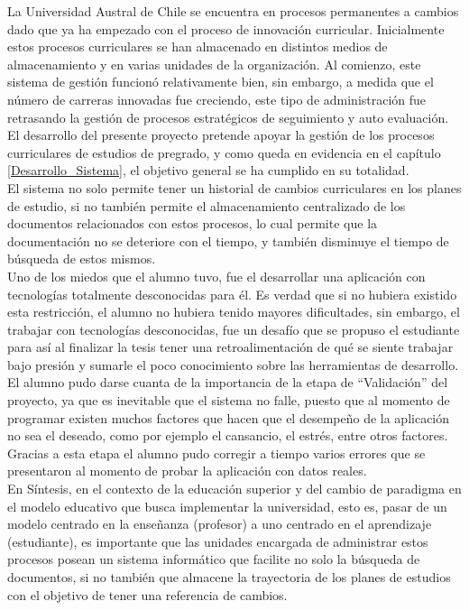La Universidad Austral de Chile se encuentra en procesos permanentes a cambios dado que ya ha empezado con
el proceso de innovación curricular.  Inicialmente estos procesos curriculares  se han almacenado en distintos medios de almacenamiento y en varias unidades de la organización. Al comienzo, este sistema de gestión  funcionó relativamente bien, sin embargo, a  medida que el número de carreras innovadas fue creciendo,  este tipo de administración  fue retrasando la gestión de procesos estratégicos de seguimiento y auto evaluación.
\\


El desarrollo del presente proyecto  pretende apoyar la gestión de los procesos curriculares de estudios de pregrado, y como queda en evidencia en el  capítulo \ref{Desarrollo_Sistema}, el objetivo general se ha cumplido en su totalidad.
\\

El sistema no solo permite tener un historial de cambios curriculares en los planes de estudio, si no también permite el almacenamiento centralizado de los documentos relacionados con estos procesos, lo cual permite  que la documentación no se deteriore con el tiempo, y también disminuye el tiempo de búsqueda de estos mismos.\\

Uno de los miedos que el alumno tuvo, fue el desarrollar una aplicación con tecnologías totalmente desconocidas para él. Es verdad que si no hubiera existido esta restricción, el alumno no hubiera tenido mayores dificultades, sin embargo, el trabajar con tecnologías desconocidas, fue un desafío que se propuso el estudiante para así al finalizar la tesis tener una retroalimentación de qué se siente trabajar bajo presión y sumarle el poco conocimiento sobre las herramientas de desarrollo.
\\ 


El alumno   pudo darse cuanta de la importancia de la  etapa de ``Validación'' del proyecto, ya que es inevitable que el sistema no falle, puesto que al momento de programar existen muchos factores que hacen que el desempeño de la aplicación no sea el deseado, como por ejemplo  el cansancio, el estrés, entre otros factores. Gracias a esta etapa el alumno pudo corregir a tiempo varios errores que se presentaron al momento de  probar la aplicación con datos reales.
\\



En Síntesis, en el contexto de la educación superior y del cambio de paradigma en el modelo educativo que busca implementar la universidad, esto es, pasar de un modelo centrado en la enseñanza (profesor) a uno centrado en el aprendizaje (estudiante), es importante que las unidades encargada de administrar estos procesos posean un sistema informático que facilite no solo la búsqueda de documentos, si no también  que almacene la trayectoria de los planes de estudios con el objetivo de tener una referencia de cambios.




